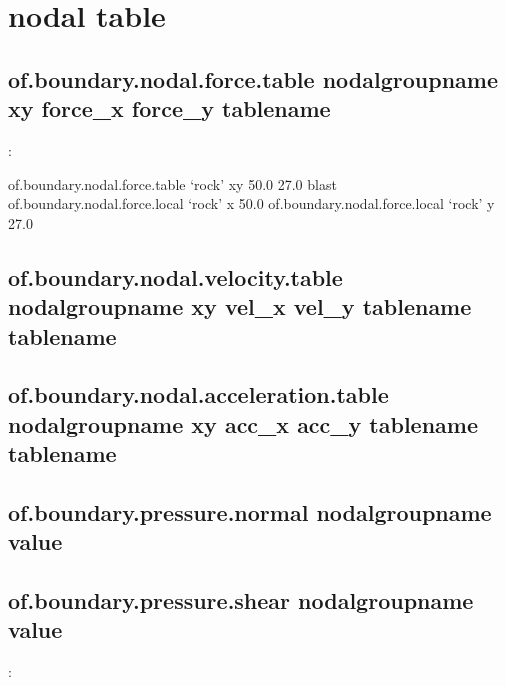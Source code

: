 \documentclass[letterpaper,10pt,english]{sphinxmanual}
\begin{document}
\section{nodal table}
\label{\detokenize{rst_tutorials/command_line_guide:nodal-table}}

\subsection{of.boundary.nodal.force.table nodalgroupname xy force\_x force\_y tablename}
\label{\detokenize{rst_tutorials/command_line_guide:of-boundary-nodal-force-table-nodalgroupname-xy-force-x-force-y-tablename}}
:

\begin{sphinxVerbatim}[commandchars=\\\{\}]
of.boundary.nodal.force.table ‘rock’ xy \PYGZhy{}50.0 27.0 blast
of.boundary.nodal.force.local ‘rock’ x \PYGZhy{}50.0
of.boundary.nodal.force.local ‘rock’ y 27.0
\end{sphinxVerbatim}


\subsection{of.boundary.nodal.velocity.table nodalgroupname xy vel\_x vel\_y tablename tablename}
\label{\detokenize{rst_tutorials/command_line_guide:of-boundary-nodal-velocity-table-nodalgroupname-xy-vel-x-vel-y-tablename-tablename}}

\subsection{of.boundary.nodal.acceleration.table nodalgroupname xy acc\_x acc\_y tablename tablename}
\label{\detokenize{rst_tutorials/command_line_guide:of-boundary-nodal-acceleration-table-nodalgroupname-xy-acc-x-acc-y-tablename-tablename}}

\subsection{of.boundary.pressure.normal nodalgroupname value}
\label{\detokenize{rst_tutorials/command_line_guide:of-boundary-pressure-normal-nodalgroupname-value}}\label{\detokenize{rst_tutorials/command_line_guide:section-10}}

\subsection{of.boundary.pressure.shear nodalgroupname value}
\label{\detokenize{rst_tutorials/command_line_guide:of-boundary-pressure-shear-nodalgroupname-value}}
:
\end{document}
